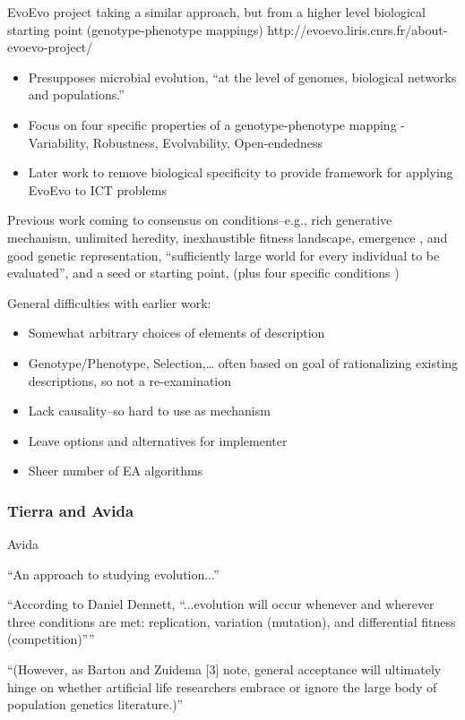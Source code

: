 EvoEvo project taking a similar approach, but from a higher level biological starting point (genotype-phenotype mappings)
http://evoevo.liris.cnrs.fr/about-evoevo-project/

\begin{itemize}
	\item Presupposes microbial evolution, ``at the level of genomes, biological networks and populations.''
	\item Focus on four specific properties of a genotype-phenotype mapping - Variability, Robustness, Evolvability, Open-endedness
	\item Later work to remove biological specificity to provide framework for applying EvoEvo to ICT problems
\end{itemize}

Previous work coming to consensus on conditions--e.g., rich generative mechanism, unlimited heredity, inexhaustible fitness landscape, emergence \autocite{Vasas2015}, and good genetic representation, ``sufficiently large world for every individual to be evaluated'', and a seed or starting point, (plus four specific conditions \autocite{Soros2014})

General difficulties with earlier work:
\begin{itemize}
	\item Somewhat arbitrary choices of elements of description
	\item Genotype/Phenotype, Selection,\ldots{} often based on goal of rationalizing existing descriptions, so not a re-examination
	\item Lack causality--so hard to use as mechanism
	\item Leave options and alternatives for implementer
	\item Sheer number of EA algorithms
\end{itemize}


\subsubsection{Tierra and Avida}

\autocite{Ofria2004}

Avida

``An approach to studying evolution...''

``According to Daniel Dennett, ``...evolution will occur whenever and
wherever three conditions are met: replication, variation (mutation),
and differential fitness (competition)''''


``(However, as Barton and Zuidema {[}3{]} note, general acceptance
will ultimately hinge on whether artificial life researchers embrace
or ignore the large body of population genetics literature.)''


